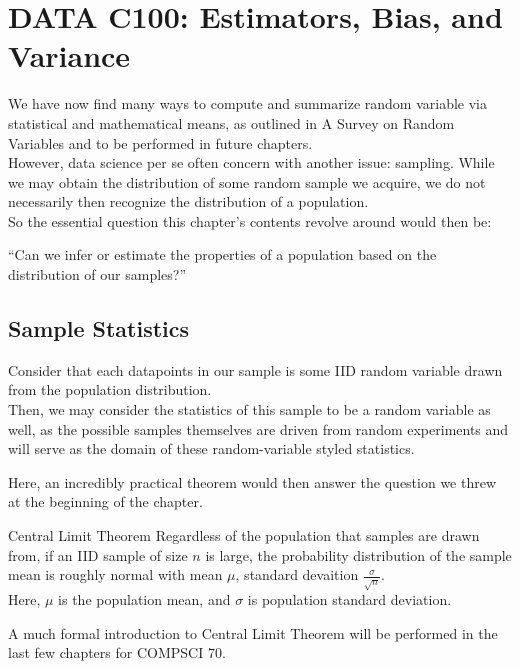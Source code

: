 \chapter{DATA C100: Estimators, Bias, and Variance}

We have now find many ways to compute and summarize random variable via statistical and mathematical means, as outlined in A Survey on Random Variables and to be performed in future chapters. \\
However, data science per se often concern with another issue: sampling. While we may obtain the distribution of some random sample we acquire, we do not necessarily then recognize the distribution of a population. \\
So the essential question this chapter's contents revolve around would then be:
\begin{center}
    ``Can we infer or estimate the properties of a population based on the distribution of our samples?''
\end{center}

\section{Sample Statistics}
Consider that each datapoints in our sample is some IID random variable drawn from the population distribution. \\
Then, we may consider the statistics of this sample to be a random variable as well, as the possible samples themselves are driven from random experiments and will serve as the domain of these random-variable styled statistics.

Here, an incredibly practical theorem would then answer the question we threw at the beginning of the chapter.
\begin{ln-theorem}{Central Limit Theorem}{}
    Regardless of the population that samples are drawn from, if an IID sample of size $n$ is large, the probability distribution of the sample mean is roughly normal with mean $\mu$, standard devaition $\frac{\sigma}{\sqrt{n}}$. \\
    Here, $\mu$ is the population mean, and $\sigma$ is population standard deviation.
\end{ln-theorem}
A much formal introduction to Central Limit Theorem will be performed in the last few chapters for COMPSCI 70.

